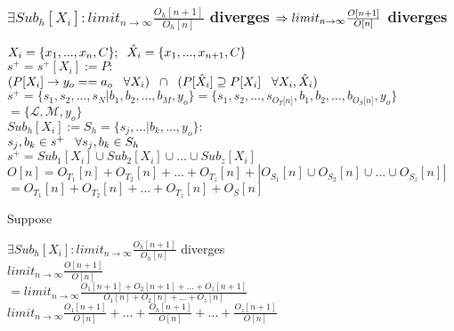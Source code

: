 \documentclass[11pt]{article}
\begin{document}
\subsubsection{$\exists Sub_h[X_i]: limit_{n \rightarrow \infty} \frac{O_h[n+1]}{O_h[n]}$ diverges $\Rightarrow\\ limit_{n \rightarrow \infty} \frac{O[n+1]}{O[n]}$  diverges}
\vspace{1mm}
\begin{center}
$
X_i = \{x_1,...,x_n,C\}; \hspace{2mm} \hat{X}_i = \{x_1,...,x_{n+1},C\}
$
\\ \vspace{2mm}
$
s^+ = s^+[X_i] := P :
$
\\ \vspace{2mm}
$
(P \lbrack X_i \rbrack \rightarrow y_{o} == a_{o} \hspace{3mm} \forall X_i) \hspace{2mm} \cap \hspace{2mm} (P[\hat{X}_i] \supseteq P[X_i] \hspace{3mm} \forall X_i,\hat{X}_i)
$
\\ \vspace{4mm}
$
s^+ = \{ s_1,s_2,...,s_N|b_1,b_2,...,b_M,y_o\} = \{ s_1,s_2,...,s_{O_T \lbrack n \rbrack }, b_1, b_2,...,b_{O_S \lbrack n \rbrack},y_o \}
$
\\ \vspace{2mm}
$
= \{ \mathcal{L},\mathcal{M},y_o\}
$
\\ \vspace{6mm}
$
Sub_h[X_i] := S_h = \{s_j,...|b_k,...,y_o\}:
$
\\ \vspace{2mm}
$
s_j, b_k \in s^+ \hspace{3mm} \forall s_j,b_k \in S_h
$
\\ \vspace{6mm}
$
s^+ = Sub_1[X_i] \cup Sub_2[X_i] \cup ... \cup Sub_z[X_i]
$
\\ \vspace{2mm}
$
O[n] = O_{T_1}[n] + O_{T_2}[n] + ... + O_{T_z}[n] + |O_{S_1}[n] \cup O_{S_2}[n] \cup  ... \cup O_{S_z}[n]|
$
\\ \vspace{2mm}
$
= O_{T_1}[n] + O_{T_2}[n] + ... + O_{T_z}[n] + O_S[n]
$
\end{center}
\vspace{8mm}
Suppose 
\begin{center}
$
\exists Sub_h[X_i]: limit_{n \rightarrow \infty} \frac{O_h[n+1]}{O_h[n]}$ diverges
\\ \vspace{8mm}
$
limit_{n \rightarrow \infty} \frac{O[n+1]}{O[n]}
$
\\ \vspace{2mm}
$
= limit_{n \rightarrow \infty} \frac{O_{1}[n+1] + O_{2}[n+1] + ... + O_{z}[n+1]}{O_{1}[n] + O_{2}[n] + ... + O_{z}[n]}
$
\\ \vspace{2mm}
$
limit_{n \rightarrow \infty} \frac{O_{1}[n+1]}{O[n]} + ... + \frac{O_{h}[n+1]}{O[n]} +  ... + \frac{O_{z}[n+1]}{O[n]}
$
\end{center}
\end{document}
